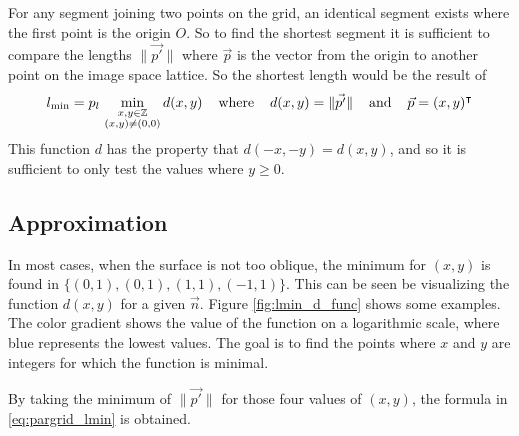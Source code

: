 For any segment joining two points on the grid, an identical segment exists where the first point is the origin $O$. So to find the shortest segment it is sufficient to compare the lengths $\| \vec{p'} \|$ where $\vec{p}$ is the vector from the origin to another point on the image space lattice. So the shortest length would be the result of
\begin{equation}
l_{\text{min}} = p_l \, \min_{\substack{x,y \in \mathbb{Z} \\ (x,y) \neq (0,0)}} d(x,y)
\hspace{4mm} \text{where} \hspace{4mm}
d(x,y) = \| \vec{p'} \|
\hspace{4mm} \text{and} \hspace{4mm}
\vec{p} = (x, y)^\intercal
\end{equation}
This function $d$ has the property that $d(-x,-y) = d(x,y)$, and so it is sufficient to only test the values where $y \geq 0$.

\subsection{Approximation}
In most cases, when the surface is not too oblique, the minimum for $(x, y)$ is found in $\{ (0, 1), (0, 1), (1, 1), (-1, 1) \}$. This can be seen be visualizing the function $d(x,y)$ for a given $\vec{n}$. Figure \ref{fig:lmin_d_func} shows some examples. The color gradient shows the value of the function on a logarithmic scale, where blue represents the lowest values. The goal is to find the points where $x$ and $y$ are integers for which the function is minimal.

By taking the minimum of $\| \vec{p'} \|$ for those four values of $(x, y)$, the formula in \ref{eq:pargrid_lmin} is obtained.

